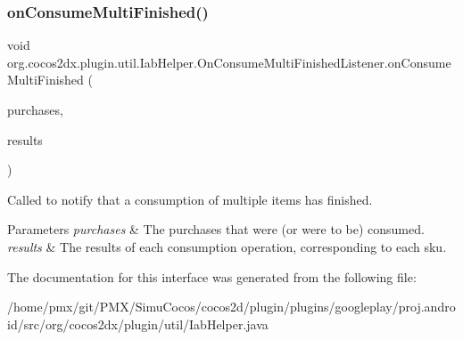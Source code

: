 \subsubsection{\texorpdfstring{on\+Consume\+Multi\+Finished()}{onConsumeMultiFinished()}}
{\footnotesize\ttfamily void org.\+cocos2dx.\+plugin.\+util.\+Iab\+Helper.\+On\+Consume\+Multi\+Finished\+Listener.\+on\+Consume\+Multi\+Finished (\begin{DoxyParamCaption}\item[{List$<$ \hyperlink{classorg_1_1cocos2dx_1_1plugin_1_1util_1_1Purchase}{Purchase} $>$}]{purchases,  }\item[{List$<$ \hyperlink{classorg_1_1cocos2dx_1_1plugin_1_1util_1_1IabResult}{Iab\+Result} $>$}]{results }\end{DoxyParamCaption})}

Called to notify that a consumption of multiple items has finished.


\begin{DoxyParams}{Parameters}
{\em purchases} & The purchases that were (or were to be) consumed. \\
\hline
{\em results} & The results of each consumption operation, corresponding to each sku. \\
\hline
\end{DoxyParams}


The documentation for this interface was generated from the following file\+:\begin{DoxyCompactItemize}
\item 
/home/pmx/git/\+P\+M\+X/\+Simu\+Cocos/cocos2d/plugin/plugins/googleplay/proj.\+android/src/org/cocos2dx/plugin/util/Iab\+Helper.\+java\end{DoxyCompactItemize}
